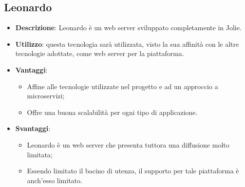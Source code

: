 \subsection{Leonardo}
\begin{itemize}
	\item \textbf{Descrizione}: Leonardo è un web server sviluppato completamente in Jolie. 
	\item \textbf{Utilizzo}: questa tecnologia sarà utilizzata, visto la sua affinità con le altre tecnologie adottate, come web server per la piattaforma.
	\item \textbf{Vantaggi}:
	\begin{itemize}
		\item Affine alle tecnologie utilizzate nel progetto e ad un approccio a microservizi;
		\item Offre una buona scalabilità per ogni tipo di applicazione.
	\end{itemize}
	\item \textbf{Svantaggi}:
	\begin{itemize}
		\item Leonardo è un web server che presenta tuttora una diffusione molto limitata;
		\item Essendo limitato il bacino di utenza, il supporto per tale piattaforma è anch'esso limitato.
	\end{itemize}
\end{itemize}

